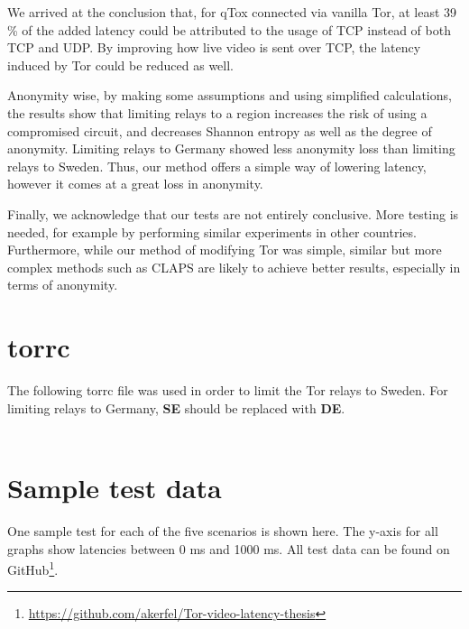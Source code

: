 \documentclass{kththesis}
\begin{document}
We arrived at the conclusion that, for qTox connected via vanilla Tor, at least 39 \% of the added latency could be attributed to the usage of TCP instead of both TCP and UDP. By improving how live video is sent over TCP, the latency induced by Tor could be reduced as well.

Anonymity wise, by making some assumptions and using simplified calculations, the results show that limiting relays to a region increases the risk of using a compromised circuit, and decreases Shannon entropy as well as the degree of anonymity. Limiting relays to Germany showed less anonymity loss than limiting relays to Sweden. Thus, our method offers a simple way of lowering latency, however it comes at a great loss in anonymity.

Finally, we acknowledge that our tests are not entirely conclusive. More testing is needed, for example by performing similar experiments in other countries. Furthermore, while our method of modifying Tor was simple, similar but more complex methods such as CLAPS \parencite{CLAPS} are likely to achieve better results, especially in terms of anonymity.

\printbibliography[heading=bibintoc]

\appendix
\chapter{torrc}
\label{section:torrcAppendix}
The following torrc file was used in order to limit the Tor relays to Sweden. For limiting relays to Germany, \textbf{SE} should be replaced with \textbf{DE}.
\\
\\
\noindent{}

\chapter{Sample test data}
\label{section:sampleTestData}
One sample test for each of the five scenarios is shown here. The y-axis for all graphs show latencies between 0 ms and 1000 ms. All test data can be found on GitHub\footnote{\url{https://github.com/akerfel/Tor-video-latency-thesis}}.
\end{document}
